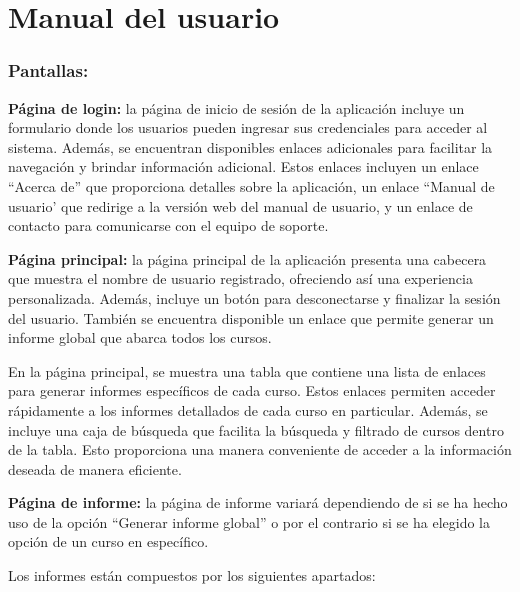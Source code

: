 \section{Manual del usuario}

\subsubsection{Pantallas:}

\textbf{Página de login:} la página de inicio de sesión de la aplicación incluye un formulario donde los usuarios pueden ingresar sus credenciales para acceder al sistema. Además, se encuentran disponibles enlaces adicionales para facilitar la navegación y brindar información adicional. Estos enlaces incluyen un enlace ``Acerca de'' que proporciona detalles sobre la aplicación, un enlace ``Manual de usuario' que redirige a la versión web del manual de usuario, y un enlace de contacto para comunicarse con el equipo de soporte.

\textbf{Página principal:} la página principal de la aplicación presenta una cabecera que muestra el nombre de usuario registrado, ofreciendo así una experiencia personalizada. Además, incluye un botón para desconectarse y finalizar la sesión del usuario. También se encuentra disponible un enlace que permite generar un informe global que abarca todos los cursos.

En la página principal, se muestra una tabla que contiene una lista de enlaces para generar informes específicos de cada curso. Estos enlaces permiten acceder rápidamente a los informes detallados de cada curso en particular. Además, se incluye una caja de búsqueda que facilita la búsqueda y filtrado de cursos dentro de la tabla. Esto proporciona una manera conveniente de acceder a la información deseada de manera eficiente.

\textbf{Página de informe:} la página de informe variará dependiendo de si se ha hecho uso de la opción ``Generar informe global'' o por el contrario si se ha elegido la opción de un curso en específico.~

Los informes están compuestos por los siguientes apartados:

